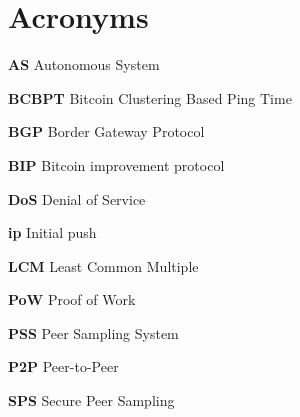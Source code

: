 










\chapter*{Acronyms}

\textbf{AS} Autonomous System

\textbf{BCBPT} Bitcoin Clustering Based Ping Time

\textbf{BGP} Border Gateway Protocol

\textbf{BIP} Bitcoin improvement protocol

\textbf{DoS} Denial of Service

\textbf{ip} Initial push

\textbf{LCM} Least Common Multiple

\textbf{PoW} Proof of Work

\textbf{PSS} Peer Sampling System

\textbf{P2P} Peer-to-Peer

\textbf{SPS} Secure Peer Sampling

\printglossary[type=\acronymtype]

